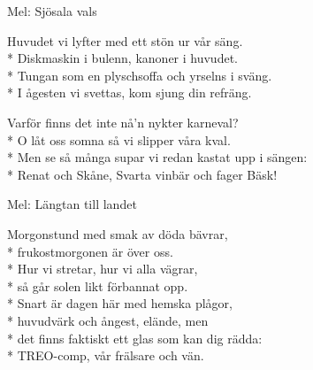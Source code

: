 \begin{SongText}[Antisnapsvisa]
\begin{SongInfo}
    Mel: Sjösala vals
\end{SongInfo}
\begin{SongVerse}
Huvudet vi lyfter med ett stön ur vår säng.\\*%
Diskmaskin i bulenn, kanoner i huvudet.\\*%
Tungan som en plyschsoffa och yrselns i sväng.\\*%
I ågesten vi svettas, kom sjung din refräng.
\end{SongVerse}
\begin{SongVerse}
Varför finns det inte nå’n nykter karneval?\\*%
O låt oss somna så vi slipper våra kval.\\*%
Men se så många supar vi redan kastat upp i sängen:\\*%
Renat och Skåne, Svarta vinbär och fager Bäsk!
\end{SongVerse}
\end{SongText}
\begin{SongText}[TREO]
\begin{SongInfo}
    Mel: Längtan till landet
\end{SongInfo}
\begin{SongVerse}
Morgonstund med smak av döda bävrar,\\*%
frukostmorgonen är över oss.\\*%
Hur vi stretar, hur vi alla vägrar,\\*%
så går solen likt förbannat opp.\\*%
Snart är dagen här med hemska plågor,\\*%
huvudvärk och ångest, elände, men\\*%
det finns faktiskt ett glas som kan dig rädda:\\*%
TREO-comp, vår frälsare och vän.
\end{SongVerse}
\end{SongText}
